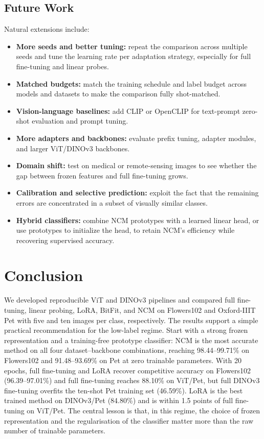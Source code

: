\documentclass[journal,11pt]{IEEEtran}
\begin{document}
\subsection{Future Work}
Natural extensions include:
\begin{itemize}
  \setlength{\itemsep}{1pt}
  \item \textbf{More seeds and better tuning:} repeat the comparison across multiple seeds and tune the learning rate per adaptation strategy, especially for full fine-tuning and linear probes.
  \item \textbf{Matched budgets:} match the training schedule and label budget across models and datasets to make the comparison fully shot-matched.
  \item \textbf{Vision-language baselines:} add CLIP or OpenCLIP for text-prompt zero-shot evaluation and prompt tuning.
  \item \textbf{More adapters and backbones:} evaluate prefix tuning, adapter modules, and larger ViT/DINOv3 backbones.
  \item \textbf{Domain shift:} test on medical or remote-sensing images to see whether the gap between frozen features and full fine-tuning grows.
  \item \textbf{Calibration and selective prediction:} exploit the fact that the remaining errors are concentrated in a subset of visually similar classes.
  \item \textbf{Hybrid classifiers:} combine NCM prototypes with a learned linear head, or use prototypes to initialize the head, to retain NCM's efficiency while recovering supervised accuracy.
\end{itemize}

\section{Conclusion}
\label{sec:conclusion}
We developed reproducible ViT and DINOv3 pipelines and compared full fine-tuning, linear probing, LoRA, BitFit, and NCM on Flowers102 and Oxford-IIIT Pet with five and ten images per class, respectively. The results support a simple practical recommendation for the low-label regime. Start with a strong frozen representation and a training-free prototype classifier: NCM is the most accurate method on all four dataset--backbone combinations, reaching 98.44--99.71\% on Flowers102 and 91.48--93.69\% on Pet at zero trainable parameters. With 20 epochs, full fine-tuning and LoRA recover competitive accuracy on Flowers102 (96.39--97.01\%) and full fine-tuning reaches 88.10\% on ViT/Pet, but full DINOv3 fine-tuning overfits the ten-shot Pet training set (46.59\%). LoRA is the best trained method on DINOv3/Pet (84.80\%) and is within 1.5 points of full fine-tuning on ViT/Pet. The central lesson is that, in this regime, the choice of frozen representation and the regularisation of the classifier matter more than the raw number of trainable parameters.
\end{document}
